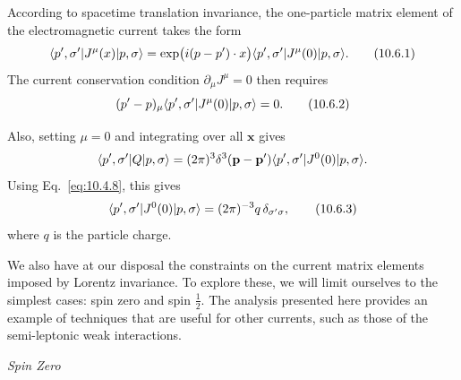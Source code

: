 According to spacetime translation invariance, the one-particle matrix element
of the electromagnetic current takes the form
\begin{equation}
  \langle p',\sigma'\rvert J^\mu(x)\lvert p,\sigma\rangle
  =\exp\bigl(i(p-p')\cdot x\bigr)
  \langle p',\sigma'\rvert J^\mu(0)\lvert p,\sigma\rangle.
  \tag{10.6.1}\label{eq:10.6.1}
\end{equation}
The current conservation condition $\partial_\mu J^\mu=0$ then requires
\begin{equation}
  (p'-p)_\mu\langle p',\sigma'\rvert J^\mu(0)\lvert p,\sigma\rangle=0.
  \tag{10.6.2}\label{eq:10.6.2}
\end{equation}

Also, setting $\mu=0$ and integrating over all $\mathbf{x}$ gives
\begin{equation*}
  \langle p',\sigma'\rvert Q\lvert p,\sigma\rangle
  =(2\pi)^3\delta^3(\mathbf{p}-\mathbf{p}')
  \langle p',\sigma'\rvert J^0(0)\lvert p,\sigma\rangle.
\end{equation*}
Using Eq.~\eqref{eq:10.4.8}, this gives
\begin{equation}
  \langle p',\sigma'\rvert J^0(0)\lvert p,\sigma\rangle
  =(2\pi)^{-3}q\,\delta_{\sigma'\sigma},
  \tag{10.6.3}\label{eq:10.6.3}
\end{equation}
where $q$ is the particle charge.

We also have at our disposal the constraints on the current matrix elements
imposed by Lorentz invariance. To explore these, we will limit ourselves to
the simplest cases: spin zero and spin $\frac12$. The analysis presented here
provides an example of techniques that are useful for other currents, such as
those of the semi-leptonic weak interactions.

\begin{center}
  \emph{Spin Zero}
\end{center}

